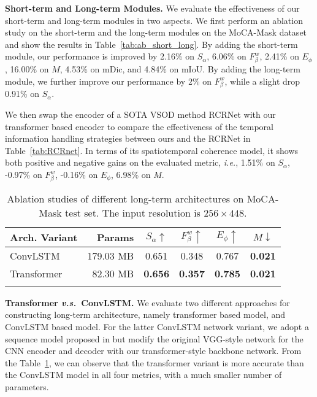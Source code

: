 \documentclass[10pt,twocolumn,letterpaper]{article}
\def\ie{\emph{i.e.}}
\def\vs{\emph{v.s.}}
\def\tabref#1{Table~\ref{#1}}
\begin{document}
\textbf{Short-term and Long-term Modules.}
We evaluate the effectiveness of our short-term and long-term modules in two aspects. We first perform an ablation study on the short-term and the long-term modules on the MoCA-Mask dataset and show the results in \tabref{tab:ab_short_long}. By adding the short-term module, our performance is improved by 2.16\% on $S_\alpha$, 6.06\% on $F_\beta^w$, 2.41\% on $E_\phi$, 16.00\% on $M$, 4.53\% on mDic, and 4.84\% on mIoU. By adding the long-term module, we further improve our performance by 2\% on $F_\beta^w$, while a slight drop 0.91\% on $S_\alpha$. 


We then swap the encoder of a SOTA VSOD method {RCRNet} \cite{yan2019semi} with our transformer based encoder to compare the effectiveness of the temporal information handling strategies between ours and the RCRNet in \tabref{tab:RCRnet}. In terms of its spatiotemporal coherence model, it shows both positive and negative gains on the evaluated metric, \ie, 1.51\% on $S_\alpha$, -0.97\% on $F_\beta^w$, -0.16\% on $E_\phi$,  6.98\% on $M$.




\begin{table}[t!]
    \footnotesize
    \centering
    \tabcolsep=0.22cm
    \caption{Ablation studies of different long-term architectures on MoCA-Mask test set. The input resolution is $ 256 \times 448$.}\label{tab:long_term_archs}
    \vspace{-5pt}
    \renewcommand{\arraystretch}{0.5}
    \begin{tabular}{lr|cccc}
    \toprule
     \textbf{Arch. Variant} & Params & $S_\alpha\uparrow$ &$F_\beta^w\uparrow$  &$E_\phi\uparrow$ &$M\downarrow$ \\ 
     \midrule
      ConvLSTM & 179.03 MB & 0.651 & 0.348  & 0.767 & \textbf{0.021} \\
      Transformer   & 82.30 MB & \textbf{0.656} & \textbf{0.357} & \textbf{0.785} & \textbf{0.021} \\
    \bottomrule
    \vspace{-4mm}
    \end{tabular}
\end{table}


\textbf{Transformer \vs~ConvLSTM.}
We evaluate two different approaches for constructing long-term architecture, namely  transformer based model, and ConvLSTM based model. For the latter ConvLSTM network variant, we adopt a sequence model proposed in \cite{denton2018stochastic} but modify the original VGG-style network for the CNN encoder and decoder with our transformer-style backbone network. From the \tabref{tab:long_term_archs}, we can observe that the transformer variant is more accurate than the ConvLSTM model in all four metrics, with a much smaller number of parameters.
\end{document}
